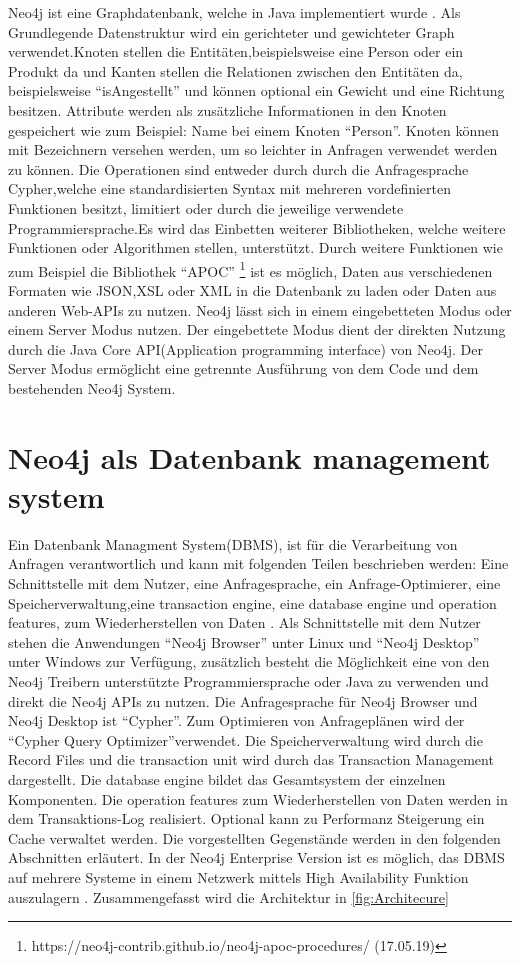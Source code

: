 Neo4j ist eine Graphdatenbank, welche in Java implementiert wurde \parencite{vukotic2015neo4j}. Als Grundlegende Datenstruktur wird ein gerichteter und gewichteter  Graph verwendet.Knoten stellen die Entitäten,beispielsweise eine Person oder ein Produkt da und  Kanten stellen die Relationen zwischen den Entitäten da, beispielsweise “isAngestellt” und können optional ein Gewicht und eine Richtung besitzen. Attribute werden als zusätzliche Informationen in den Knoten gespeichert wie zum Beispiel: Name bei einem Knoten “Person”. Knoten können mit Bezeichnern versehen werden, um so leichter in Anfragen  verwendet werden zu können. Die Operationen sind entweder durch durch die  Anfragesprache  Cypher,welche eine standardisierten Syntax mit  mehreren vordefinierten Funktionen besitzt, limitiert oder durch die jeweilige verwendete Programmiersprache.Es wird das Einbetten weiterer Bibliotheken, welche weitere Funktionen oder Algorithmen stellen, unterstützt. Durch weitere Funktionen wie zum Beispiel die Bibliothek “APOC” \footnote{https://neo4j-contrib.github.io/neo4j-apoc-procedures/ (17.05.19) } ist es möglich, Daten aus verschiedenen Formaten wie JSON,XSL oder XML in die Datenbank zu laden oder Daten aus anderen Web-APIs zu nutzen. Neo4j lässt sich in einem  eingebetteten Modus oder einem  Server Modus nutzen. Der eingebettete Modus dient der direkten  Nutzung durch die Java Core API(Application programming interface)  von Neo4j. Der Server Modus ermöglicht eine getrennte Ausführung von dem Code und dem bestehenden Neo4j System.

\section{Neo4j als Datenbank management system}
Ein Datenbank Managment System(DBMS), ist für die Verarbeitung von Anfragen verantwortlich und kann mit folgenden Teilen beschrieben werden: Eine Schnittstelle mit dem Nutzer, eine Anfragesprache, ein Anfrage-Optimierer, eine Speicherverwaltung,eine transaction engine, eine database engine und operation features, zum Wiederherstellen von Daten \parencite{angles2012comparison}. Als Schnittstelle mit dem Nutzer stehen die Anwendungen “Neo4j Browser” unter Linux und “Neo4j Desktop” unter Windows zur Verfügung, zusätzlich besteht die Möglichkeit eine von den Neo4j Treibern unterstützte Programmiersprache  oder Java zu verwenden und direkt die Neo4j APIs zu nutzen. Die Anfragesprache für Neo4j Browser und Neo4j Desktop ist “Cypher”. Zum Optimieren von Anfrageplänen wird der “Cypher Query Optimizer”verwendet. Die Speicherverwaltung wird durch die Record Files und die transaction unit  wird durch das Transaction Management dargestellt. Die database engine bildet das Gesamtsystem der einzelnen Komponenten. Die operation features zum Wiederherstellen von Daten werden in dem Transaktions-Log realisiert. Optional kann zu  Performanz Steigerung ein Cache verwaltet werden. Die vorgestellten Gegenstände werden in den folgenden Abschnitten erläutert. In der Neo4j Enterprise Version ist es möglich, das DBMS auf mehrere Systeme in einem Netzwerk mittels High Availability Funktion auszulagern \parencite{vukotic2015neo4j}. Zusammengefasst wird die Architektur in \ref{fig:Architecure}

